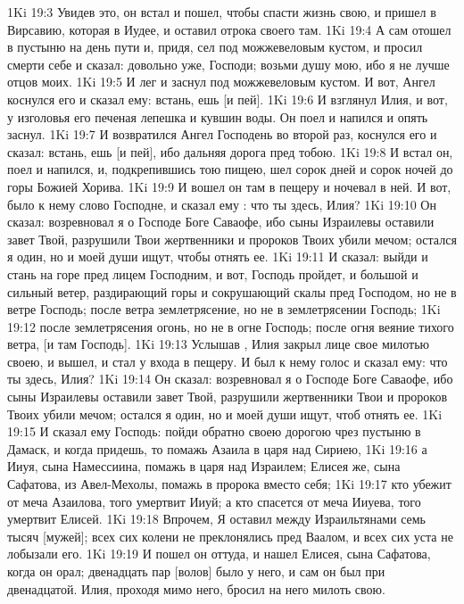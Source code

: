\vs 1Ki 19:3 Увидев это, он встал и пошел, чтобы спасти жизнь свою, и пришел в Вирсавию, которая в Иудее, и оставил отрока своего там.
\vs 1Ki 19:4 А сам отошел в пустыню на день пути и, придя, сел под можжевеловым кустом, и просил смерти себе и сказал: довольно уже, Господи; возьми душу мою, ибо я не лучше отцов моих.
\vs 1Ki 19:5 И лег и заснул под можжевеловым кустом. И вот, Ангел коснулся его и сказал ему: встань, ешь [и пей].
\vs 1Ki 19:6 И взглянул Илия, и вот, у изголовья его печеная лепешка и кувшин воды. Он поел и напился и опять заснул.
\vs 1Ki 19:7 И возвратился Ангел Господень во второй раз, коснулся его и сказал: встань, ешь [и пей], ибо дальняя дорога пред тобою.
\vs 1Ki 19:8 И встал он, поел и напился, и, подкрепившись тою пищею, шел сорок дней и сорок ночей до горы Божией Хорива.
\vs 1Ki 19:9 И вошел он там в пещеру и ночевал в ней. И вот, было к нему слово Господне, и сказал ему : что ты здесь, Илия?
\vs 1Ki 19:10 Он сказал: возревновал я о Господе Боге Саваофе, ибо сыны Израилевы оставили завет Твой, разрушили Твои жертвенники и пророков Твоих убили мечом; остался я один, но и моей души ищут, чтобы отнять ее.
\vs 1Ki 19:11 И сказал: выйди и стань на горе пред лицем Господним, и вот, Господь пройдет, и большой и сильный ветер, раздирающий горы и сокрушающий скалы пред Господом, но не в ветре Господь; после ветра землетрясение, но не в землетрясении Господь;
\vs 1Ki 19:12 после землетрясения огонь, но не в огне Господь; после огня веяние тихого ветра, [и там Господь].
\vs 1Ki 19:13 Услышав , Илия закрыл лице свое милотью своею, и вышел, и стал у входа в пещеру. И был к нему голос и сказал ему: что ты здесь, Илия?
\vs 1Ki 19:14 Он сказал: возревновал я о Господе Боге Саваофе, ибо сыны Израилевы оставили завет Твой, разрушили жертвенники Твои и пророков Твоих убили мечом; остался я один, но и моей души ищут, чтоб отнять ее.
\vs 1Ki 19:15 И сказал ему Господь: пойди обратно своею дорогою чрез пустыню в Дамаск, и когда придешь, то помажь Азаила в царя над Сириею,
\vs 1Ki 19:16 а Ииуя, сына Намессиина, помажь в царя над Израилем; Елисея же, сына Сафатова, из Авел-Мехолы, помажь в пророка вместо себя;
\vs 1Ki 19:17 кто убежит от меча Азаилова, того умертвит Ииуй; а кто спасется от меча Ииуева, того умертвит Елисей.
\vs 1Ki 19:18 Впрочем, Я оставил между Израильтянами семь тысяч [мужей]; всех сих колени не преклонялись пред Ваалом, и всех сих уста не лобызали его.
\vs 1Ki 19:19 И пошел он оттуда, и нашел Елисея, сына Сафатова, когда он орал; двенадцать пар [волов] было у него, и сам он был при двенадцатой. Илия, проходя мимо него, бросил на него милоть свою.
